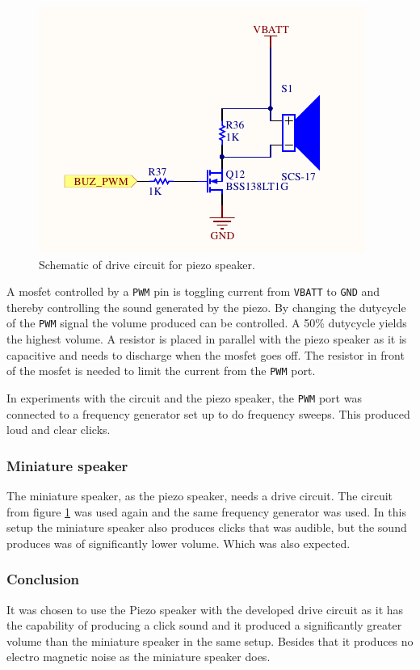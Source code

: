 \begin{figure}[h]
	\centering
	\includegraphics[width=.6\linewidth]{graphics/buzzer_circuit.pdf}
	\caption{Schematic of drive circuit for piezo speaker.}
	\label{fig:buzzer_circuit}
\end{figure}

A mosfet controlled by a \texttt{PWM} pin is toggling current from \texttt{VBATT} to \texttt{GND} and thereby controlling the sound generated by the piezo.
By changing the dutycycle of the \texttt{PWM} signal the volume produced can be controlled. 
A 50\% dutycycle yields the highest volume. 
A resistor is placed in parallel with the piezo speaker as it is capacitive and needs to discharge when the mosfet goes off.
The resistor in front of the mosfet is needed to limit the current from the \texttt{PWM} port. 

In experiments with the circuit and the piezo speaker, the \texttt{PWM} port was connected to a frequency generator set up to do frequency sweeps.
This produced loud and clear clicks.

\subsubsection*{Miniature speaker}
The miniature speaker, as the piezo speaker, needs a drive circuit. 
The circuit from figure \ref{fig:buzzer_circuit} was used again and the same frequency generator was used. 
In this setup the miniature speaker also produces clicks that was audible, but the sound produces was of significantly lower volume.
Which was also expected.  

\subsubsection*{Conclusion}
It was chosen to use the Piezo speaker with the developed drive circuit as it has the capability of producing a click sound and it produced a significantly greater volume than the miniature speaker in the same setup. 
Besides that it produces no electro magnetic noise as the miniature speaker does. 

